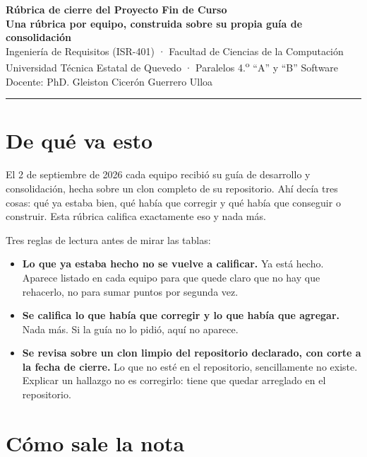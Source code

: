 \documentclass[11pt,a4paper]{article}
\begin{document}
\begin{center}
    {\LARGE\bfseries\color{uteqverde} Rúbrica de cierre del Proyecto Fin de Curso}\\[6pt]
    {\large\bfseries Una rúbrica por equipo, construida sobre su propia guía de consolidación}\\[8pt]
    Ingeniería de Requisitos (ISR-401) · Facultad de Ciencias de la Computación\\
    Universidad Técnica Estatal de Quevedo · Paralelos 4.\textsuperscript{o} ``A'' y ``B'' Software\\[4pt]
    \small Docente: PhD. Gleiston Cicerón Guerrero Ulloa
\end{center}

\vspace{4pt}
\hrule
\vspace{10pt}

\section*{De qué va esto}

El 2 de septiembre de 2026 cada equipo recibió su guía de desarrollo y consolidación, hecha sobre un clon completo de su repositorio. Ahí decía tres cosas: qué ya estaba bien, qué había que corregir y qué había que conseguir o construir. Esta rúbrica califica exactamente eso y nada más.

Tres reglas de lectura antes de mirar las tablas:

\begin{itemize}
    \item \textbf{Lo que ya estaba hecho no se vuelve a calificar.} Ya está hecho. Aparece listado en cada equipo para que quede claro que no hay que rehacerlo, no para sumar puntos por segunda vez.
    \item \textbf{Se califica lo que había que corregir y lo que había que agregar.} Nada más. Si la guía no lo pidió, aquí no aparece.
    \item \textbf{Se revisa sobre un clon limpio del repositorio declarado, con corte a la fecha de cierre.} Lo que no esté en el repositorio, sencillamente no existe. Explicar un hallazgo no es corregirlo: tiene que quedar arreglado en el repositorio.
\end{itemize}

\section*{Cómo sale la nota}
\end{document}
